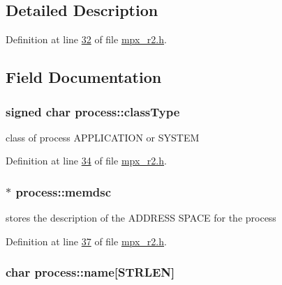 \subsection{Detailed Description}


Definition at line \hyperlink{mpx__r2_8h_source_l00032}{32} of file \hyperlink{mpx__r2_8h_source}{mpx\_\-r2.h}.



\subsection{Field Documentation}
\hypertarget{structprocess_abe608249826d4a0f04fba4398f967047}{
\subsubsection[{classType}]{\setlength{\rightskip}{0pt plus 5cm}signed char {\bf process::classType}}}
\label{structprocess_abe608249826d4a0f04fba4398f967047}


class of process APPLICATION or SYSTEM 



Definition at line \hyperlink{mpx__r2_8h_source_l00034}{34} of file \hyperlink{mpx__r2_8h_source}{mpx\_\-r2.h}.

\hypertarget{structprocess_a163551ab7b60184b48e5d440fcd5c2b8}{
\subsubsection[{memdsc}]{$\ast$ {\bf process::memdsc}}}
\label{structprocess_a163551ab7b60184b48e5d440fcd5c2b8}


stores the description of the ADDRESS SPACE for the process 



Definition at line \hyperlink{mpx__r2_8h_source_l00037}{37} of file \hyperlink{mpx__r2_8h_source}{mpx\_\-r2.h}.

\hypertarget{structprocess_ab6613e7bde642a754f71b9f60053cd1a}{
\subsubsection[{name}]{\setlength{\rightskip}{0pt plus 5cm}char {\bf process::name}\mbox{[}STRLEN\mbox{]}}}
\label{structprocess_ab6613e7bde642a754f71b9f60053cd1a}


